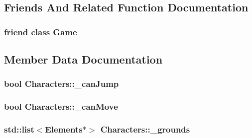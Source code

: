 \subsection{Friends And Related Function Documentation}
\hypertarget{class_characters_aa2fab026580d6f14280c2ffb8063a314}{
\subsubsection[{Game}]{\setlength{\rightskip}{0pt plus 5cm}friend class {\bf Game}\hspace{0.3cm}{\ttfamily [friend]}}}\label{class_characters_aa2fab026580d6f14280c2ffb8063a314}


\subsection{Member Data Documentation}
\hypertarget{class_characters_a7488ab360a4a770d46a2578f87f02511}{
\subsubsection[{\-\_\-can\-Jump}]{\setlength{\rightskip}{0pt plus 5cm}bool Characters\-::\-\_\-can\-Jump\hspace{0.3cm}{\ttfamily [protected]}}}\label{class_characters_a7488ab360a4a770d46a2578f87f02511}
\hypertarget{class_characters_a817a390b358c806dd3e5c353a815871c}{
\subsubsection[{\-\_\-can\-Move}]{\setlength{\rightskip}{0pt plus 5cm}bool Characters\-::\-\_\-can\-Move\hspace{0.3cm}{\ttfamily [protected]}}}\label{class_characters_a817a390b358c806dd3e5c353a815871c}
\hypertarget{class_characters_a35ee6e0ded905f63112a08cd3ad76435}{
\subsubsection[{\-\_\-grounds}]{\setlength{\rightskip}{0pt plus 5cm}std\-::list$<${\bf Elements}$\ast$$>$ Characters\-::\-\_\-grounds\hspace{0.3cm}{\ttfamily [protected]}}}\label{class_characters_a35ee6e0ded905f63112a08cd3ad76435}
